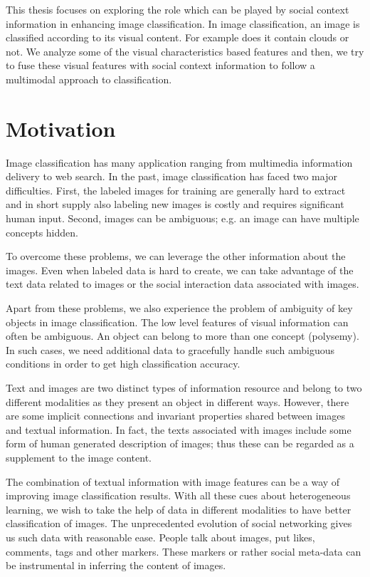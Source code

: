 This thesis focuses on exploring the role which can be played
by social context information in enhancing image classification.
In image classification, an image is classified according to its
visual content. For example does it contain clouds or not. We
analyze some of the visual characteristics based features and then,
we try to fuse these visual features with social context
information to follow a multimodal approach to classification.
\section{Motivation}
Image classification has many application ranging from multimedia
information delivery to web search. In the past, image
classification has faced two major difficulties. First, the labeled
images for training are generally hard to extract and in short
supply also labeling new images is costly and requires significant
human input. Second, images can be ambiguous; e.g. an image can have
multiple concepts hidden.

To overcome these problems, we can leverage the other information
about the images. Even when labeled data is hard to create, we can
take advantage of the text data related to images or the social
interaction data associated with images.

Apart from these problems, we also experience the problem of
ambiguity of key objects in image classification. The low level
features of visual information can often be ambiguous. An object can
belong to more than one concept (polysemy). In such cases, we need
additional data to gracefully handle such ambiguous
conditions in order to get high classification accuracy.

Text and images are two distinct types of information resource and
belong to two different modalities as they present an object in
different ways. However, there are some implicit connections and
invariant properties shared between images and textual information.
In fact, the texts associated with images include some form of human
generated description of images; thus these can be regarded as a
supplement to the image content.

The combination of textual information with image features can be a
way of improving image classification results. With all these cues
about heterogeneous learning, we wish to take the help of data in
different modalities to have better classification of images. The
unprecedented evolution of social networking gives us such data with
reasonable ease. People talk about images, put likes, comments,
tags and other markers. These markers or rather social meta-data can
be instrumental in inferring the content of images.

